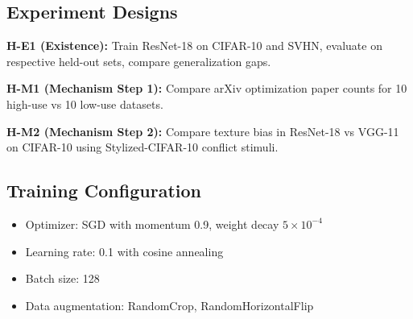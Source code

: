 \subsection{Experiment Designs}

\textbf{H-E1 (Existence):} Train ResNet-18 on CIFAR-10 and SVHN, evaluate on respective held-out sets, compare generalization gaps.

\textbf{H-M1 (Mechanism Step 1):} Compare arXiv optimization paper counts for 10 high-use vs 10 low-use datasets.

\textbf{H-M2 (Mechanism Step 2):} Compare texture bias in ResNet-18 vs VGG-11 on CIFAR-10 using Stylized-CIFAR-10 conflict stimuli.

\subsection{Training Configuration}

\begin{itemize}
    \item Optimizer: SGD with momentum 0.9, weight decay $5 \times 10^{-4}$
    \item Learning rate: 0.1 with cosine annealing
    \item Batch size: 128
    \item Data augmentation: RandomCrop, RandomHorizontalFlip
\end{itemize}
